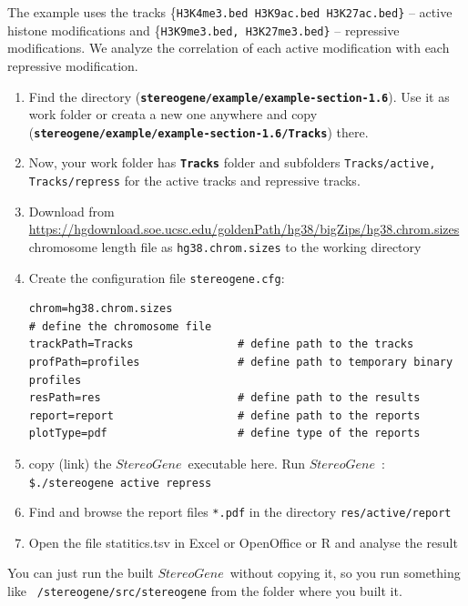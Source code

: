 \documentclass{article}
\newcommand{\prm}[1]{\texttt{\textbf{{#1}}}}
\newcommand{\pr}[1]{\texttt{{#1}}}
\newcommand{\sg}{$StereoGene$\ }
\begin{document}
The example uses the tracks \{\pr{H3K4me3.bed H3K9ac.bed H3K27ac.bed\}} -- active histone modifications and \{\pr{H3K9me3.bed, H3K27me3.bed\}} -- repressive modifications. We analyze the correlation of each active modification with each repressive modification.
\begin{enumerate}
\item Find the directory (\prm{stereogene/example/example-section-1.6}). Use it as work folder or creata a new one anywhere and copy  (\prm{stereogene/example/example-section-1.6/Tracks}) there.
\item Now, your work folder has \prm{Tracks} folder and subfolders \pr{Tracks/active, Tracks/repress} for the active tracks and repressive tracks.
\item Download from \url{https://hgdownload.soe.ucsc.edu/goldenPath/hg38/bigZips/hg38.chrom.sizes} chromosome length file as {\pr{hg38.chrom.sizes}} to the working directory
\item Create the configuration file \pr{stereogene.cfg}:

\begin{shaded} 
\begin{verbatim}
chrom=hg38.chrom.sizes
# define the chromosome file
trackPath=Tracks                # define path to the tracks
profPath=profiles               # define path to temporary binary profiles
resPath=res                     # define path to the results
report=report                   # define path to the reports
plotType=pdf                    # define type of the reports
\end{verbatim}
\end{shaded}


\item copy (link) the \sg executable here. Run \sg: 
\pr{\$./stereogene active repress}
\item Find and browse the report files \pr{*.pdf} in the directory \pr{res/active/report}
\item Open the file statitics.tsv in Excel or OpenOffice or R and analyse the result
\end{enumerate}
You can just run the built \sg without copying it, so you run something like {\pr{~/stereogene/src/stereogene}} from the folder where you built it.
\end{document}
